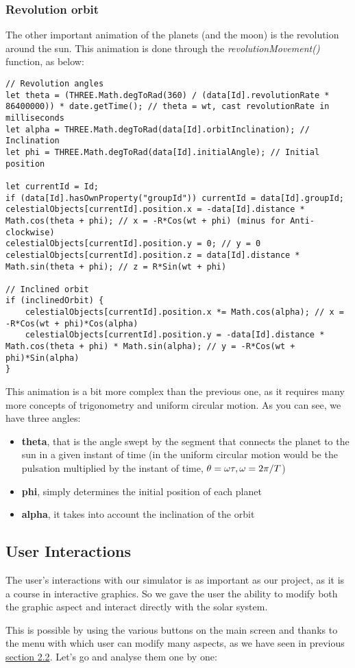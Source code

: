 \documentclass{article}
\begin{document}
\subsubsection{Revolution orbit}
The other important animation of the planets (and the moon) is the revolution around the sun. This animation is done through the \textit{revolutionMovement()} function, as below:
\begin{lstlisting}
// Revolution angles
let theta = (THREE.Math.degToRad(360) / (data[Id].revolutionRate * 86400000)) * date.getTime(); // theta = wt, cast revolutionRate in milliseconds
let alpha = THREE.Math.degToRad(data[Id].orbitInclination); // Inclination
let phi = THREE.Math.degToRad(data[Id].initialAngle); // Initial position

let currentId = Id;
if (data[Id].hasOwnProperty("groupId")) currentId = data[Id].groupId;
celestialObjects[currentId].position.x = -data[Id].distance * Math.cos(theta + phi); // x = -R*Cos(wt + phi) (minus for Anti-clockwise)
celestialObjects[currentId].position.y = 0; // y = 0
celestialObjects[currentId].position.z = data[Id].distance * Math.sin(theta + phi); // z = R*Sin(wt + phi)

// Inclined orbit
if (inclinedOrbit) {
	celestialObjects[currentId].position.x *= Math.cos(alpha); // x = -R*Cos(wt + phi)*Cos(alpha)
	celestialObjects[currentId].position.y = -data[Id].distance * Math.cos(theta + phi) * Math.sin(alpha); // y = -R*Cos(wt + phi)*Sin(alpha)
}
\end{lstlisting}
This animation is a bit more complex than the previous one, as it requires many more concepts of trigonometry and uniform circular motion.
As you can see, we have three angles:
\begin{itemize}
	\item \textbf{theta}, that is the angle swept by the segment that connects the planet to the sun in a given instant of time (in the uniform circular motion would be the pulsation multiplied by the instant of time, $\theta = \omega\tau, \omega = 2\pi\textrm/{T} $)
	\item \textbf{phi}, simply determines the initial position of each planet
	\item \textbf{alpha}, it takes into account the inclination of the orbit
\end{itemize}

\subsection{User Interactions}
The user's interactions with our simulator is as important as our project, as it is a course in interactive graphics. So we gave the user the ability to modify both the graphic aspect and interact directly with the solar system.
\par This is possible by using the various buttons on the main screen and thanks to the menu with which user can modify many aspects, as we have seen in previous \hyperref[menuoptions:section]{section 2.2}. Let's go and analyse them one by one:
\end{document}
